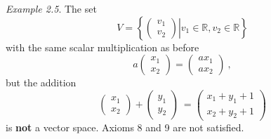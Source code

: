 \documentclass[
  letterpaper,
  DIV=11,
  numbers=noendperiod]{scrartcl}
\theoremstyle{remark}
\begin{document}
\emph{Example 2.5}. The set
\[V= \left\{ \left.  \begin{pmatrix}   v_{1}\\ v_{2}  \end{pmatrix}  \right| v_1 \in   \mathbb{R}, v_2 \in  \mathbb{R}\right\}\]
with the same scalar multiplication as before
\[a   \begin{pmatrix}   x_1 \\ x_2  \end{pmatrix}  =   \begin{pmatrix}   a x_1 \\  a x_2  \end{pmatrix}  \ ,\]
but the addition \[ \begin{pmatrix}   x_1 \\ x_2  \end{pmatrix} 
  +
  \begin{pmatrix}   y_1 \\ y_2  \end{pmatrix} \
  =\begin{pmatrix}   x_1+y_1+1 \\ x_2+y_2+1  \end{pmatrix}\] is
\textbf{not} a vector space. Axioms 8 and 9 are not satisfied.
\end{document}
